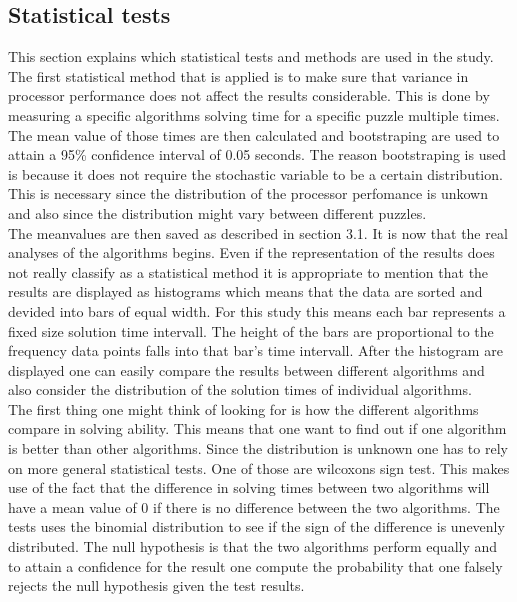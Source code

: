 \documentclass[a4paper,11pt]{kth-mag}
\begin{document}
\FloatBarrier
\subsection{Statistical tests}
\label{sec:statisticalTests}
This section explains which statistical tests and methods are used in the study.
The first statistical method that is applied is to make sure that variance in processor performance does not affect the results considerable. 
This is done by measuring a specific algorithms solving time for a specific puzzle multiple times. 
The mean value of those times are then calculated and bootstraping are used to attain a 95\% confidence interval of 0.05 seconds. 
The reason bootstraping is used is because it does not require the stochastic variable to be a certain distribution. 
This is necessary since the distribution of the processor perfomance is unkown and also since the distribution might vary between different puzzles. \\
The meanvalues are then saved as described in section 3.1.
It is now that the real analyses of the algorithms begins. 
Even if the representation of the results does not really classify as a statistical method it is appropriate to mention that the results are displayed as histograms which means that the data are sorted and devided into bars of equal width. 
For this study this means each bar represents a fixed size solution time intervall. 
The height of the bars are proportional to the frequency data points falls into that bar's time intervall.
After the histogram are displayed one can easily compare the results between different algorithms and also consider the distribution of the solution times of individual algorithms.\\
The first thing one might think of looking for is how the different algorithms compare in solving ability. 
This means that one want to find out if one algorithm is better than other algorithms. 
Since the distribution is unknown one has to rely on more general statistical tests. 
One of those are wilcoxons sign test. 
This makes use of the fact that the difference in solving times between two algorithms will have a mean value of 0 if there is no difference between the two algorithms. 
The tests uses the binomial distribution to see if the sign of the difference is unevenly distributed.
The null hypothesis is that the two algorithms perform equally and to attain a confidence for the result one compute the probability that one falsely rejects the null hypothesis given the test results.
\\
\end{document}
